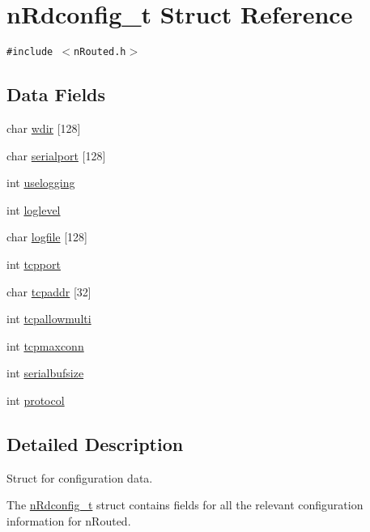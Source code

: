 \hypertarget{structnRdconfig__t}{
\section{n\-Rdconfig\_\-t Struct Reference}
\label{structnRdconfig__t}
}
{\tt \#include $<$n\-Routed.h$>$}

\subsection*{Data Fields}
\begin{CompactItemize}
\item 
char \hyperlink{structnRdconfig__t_a7672061ebda79d00c44848f9fdd92f1}{wdir} \mbox{[}128\mbox{]}
\item 
char \hyperlink{structnRdconfig__t_3547a24e8d3de9b4fd944436dc8ac4ce}{serialport} \mbox{[}128\mbox{]}
\item 
int \hyperlink{structnRdconfig__t_1ea3e47a7eb26c77e75e086d43accfb5}{uselogging}
\item 
int \hyperlink{structnRdconfig__t_22ac64dd30576544d6da3aaad596093f}{loglevel}
\item 
char \hyperlink{structnRdconfig__t_5dbdadb12b1dfa4a7266f0ac7b4c9ee6}{logfile} \mbox{[}128\mbox{]}
\item 
int \hyperlink{structnRdconfig__t_38a3366fe88f4f983001879c3d21532b}{tcpport}
\item 
char \hyperlink{structnRdconfig__t_7bc3c655e748fa2f111b01c18ce42e30}{tcpaddr} \mbox{[}32\mbox{]}
\item 
int \hyperlink{structnRdconfig__t_8b2003cf3fd6431e43d6e53ec563a968}{tcpallowmulti}
\item 
int \hyperlink{structnRdconfig__t_76150067cf1ce716265a738d93e46c75}{tcpmaxconn}
\item 
int \hyperlink{structnRdconfig__t_fbda9271df1df01f8670ec718d3b73d3}{serialbufsize}
\item 
int \hyperlink{structnRdconfig__t_69ce236d67271ff0a4c579ab2a9a0698}{protocol}
\end{CompactItemize}


\subsection{Detailed Description}
Struct for configuration data.

The \hyperlink{structnRdconfig__t}{n\-Rdconfig\_\-t} struct contains fields for all the relevant configuration information for n\-Routed. 



